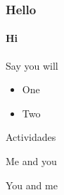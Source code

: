 \documentclass{beamer}
\begin{document}
\frame
{
    \frametitle{Hello}
    \framesubtitle{Hi}

    {
    \begin{block}{Say you will}
        \begin{itemize}
            \item One
            \item Two
        \end{itemize}
    \end{block}
    }
    \begin{block}{Actividades}
        \begin{enumerate}
            \footnotesize{
                \item Me and you
                \item You and me  
            }
        \end{enumerate}
    \end{block}
}
\end{document}
